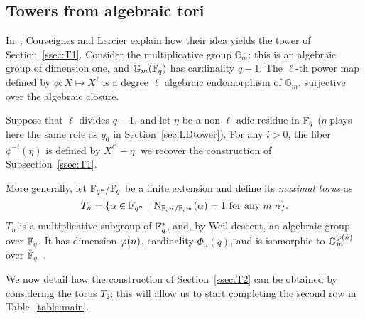 \documentclass{sig-alternate}
\begin{document}

\subsection{Towers from algebraic tori}
\label{ssec:fibers-T2}
In~\cite{couveignes+lercier11}, Couveignes and Lercier explain how
their idea yields the tower of Section~\ref{ssec:T1}. Consider the
multiplicative group $\mathbb{G}_m$: this is an algebraic group of
dimension one, and $\mathbb{G}_m(\mathbb{F}_q)$ has cardinality $q-1$.  The
$\ell$-th power map defined by $\phi:X\mapsto X^\ell$ is a degree
$\ell$ algebraic endomorphism of $\mathbb{G}_m$, surjective over the
algebraic closure.

Suppose that $\ell$ divides $q-1$, and let $\eta$ be a non $\ell$-adic
residue in $\mathbb{F}_q$ ($\eta$ plays here the same role as $y_0$ in
Section~\ref{sec:LDtower}). For any $i>0$, the fiber $\phi^{-i}(\eta)$
is defined by $X^{\ell^i}-\eta$: we recover the construction of
Subsection~\ref{ssec:T1}.

More generally, let $\mathbb{F}_{q^n}/\mathbb{F}_q$ be a finite extension and define
its \emph{maximal torus} as
\begin{equation}
  \label{eq:Tn}
  T_n = \{\alpha\in\mathbb{F}_{q^n} \;|\; \operatorname{N}_{\mathbb{F}_{q^n}/\mathbb{F}_{q^m}}(\alpha) = 1 
  \text{ for any $m|n$} \}.
\end{equation}
$T_n$ is a multiplicative subgroup of $\mathbb{F}_q^\ast$, and, by Weil
descent, an algebraic group over $\mathbb{F}_q$. It has dimension $\varphi(n)$,
cardinality $\Phi_n(q)$, and is isomorphic to
$\mathbb{G}_m^{\varphi(n)}$ over $\bar {\mathbb{F}}_q$~\cite{rubin+silverberg03,voskresenskii98}.

We now detail how the construction of Section~\ref{ssec:T2} can be
obtained by considering the torus $T_2$; this will allow us to start
completing the second row in Table~\ref{table:main}.
\end{document}
